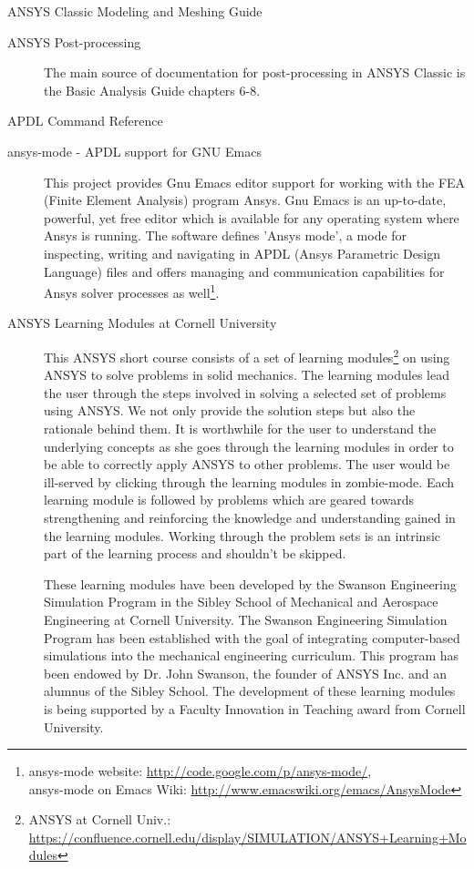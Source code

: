 \begin{description}
\item[ANSYS Classic Modeling and Meshing Guide] \cite{ANSYSModelMeshGuide2010}
\item[ANSYS   Post-processing]   The   main   source  of   documentation   for
post-processing   in    ANSYS   Classic   is   the    Basic   Analysis   Guide
\cite{ANSYSBasicAnaGuide2010} chapters 6-8.
\item[APDL Command Reference] \cite{ANSYSCommandRef2010}
\item[ansys-mode - APDL support for GNU Emacs] This project provides Gnu Emacs
editor  support for  working with  the FEA  (Finite Element  Analysis) program
Ansys.   Gnu  Emacs is  an  up-to-date, powerful,  yet  free  editor which  is
available  for any  operating  system  where Ansys  is  running. The  software
defines 'Ansys  mode', a mode for  inspecting, writing and  navigating in APDL
(Ansys Parametric Design Language) files and offers managing and communication
capabilities for  Ansys solver processes  as well\footnote{ansys-mode website:
\url{http://code.google.com/p/ansys-mode/},\\   ansys-mode   on  Emacs   Wiki:
\url{http://www.emacswiki.org/emacs/AnsysMode}}.

\item[ANSYS Learning  Modules at Cornell  University] This ANSYS  short course
consists  of  a  set  of  learning modules\footnote{ANSYS  at  Cornell  Univ.:
\url{https://confluence.cornell.edu/display/SIMULATION/ANSYS+Learning+Modules}}
on using ANSYS to solve problems in solid mechanics. The learning modules lead
the user  through the  steps involved  in solving a  selected set  of problems
using ANSYS.   We not only provide  the solution steps but  also the rationale
behind  them. It  is  worthwhile for  the  user to  understand the  underlying
concepts  as she goes  through the  learning modules  in order  to be  able to
correctly  apply ANSYS  to other  problems. The  user would  be  ill-served by
clicking through the learning modules  in zombie-mode. Each learning module is
followed by  problems which are  geared towards strengthening  and reinforcing
the  knowledge and  understanding  gained in  the  learning modules.   Working
through the  problem sets  is an  intrinsic part of  the learning  process and
shouldn't be skipped.

These  learning  modules  have  been  developed  by  the  Swanson  Engineering
Simulation  Program   in  the  Sibley  School  of   Mechanical  and  Aerospace
Engineering at Cornell University.  The Swanson Engineering Simulation Program
has been  established with the goal of  integrating computer-based simulations
into the mechanical  engineering curriculum. This program has  been endowed by
Dr.  John Swanson, the  founder of  ANSYS Inc.  and an  alumnus of  the Sibley
School.  The development of  these learning  modules is  being supported  by a
Faculty Innovation in Teaching award from Cornell University.


\end{description}
